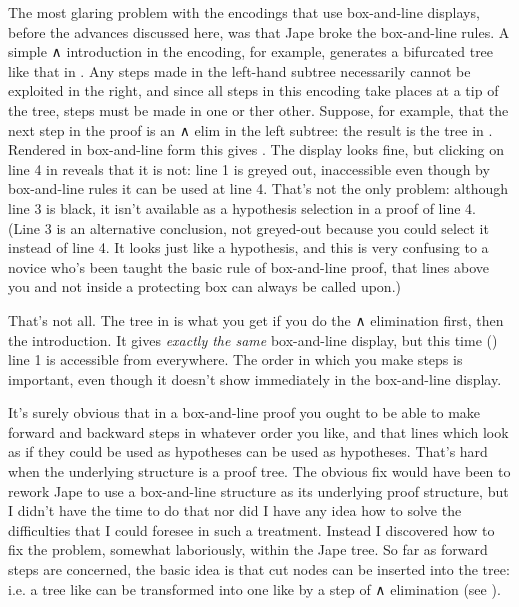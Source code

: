 The most glaring problem with the encodings that use box-and-line displays, before the advances discussed here, was that Jape broke the box-and-line rules. A simple ∧ introduction in the  encoding, for example, generates a bifurcated tree like that in . Any steps made in the left-hand subtree necessarily cannot be exploited in the right, and since all steps in this encoding take places at a tip of the tree, steps must be made in one or ther other. Suppose, for example, that the next step in the proof is an ∧ elim in the left subtree: the result is the tree in . Rendered in box-and-line form this gives . The display looks fine, but clicking on line 4 in  reveals that it is not: line 1 is greyed out, inaccessible even though by box-and-line rules it can be used at line 4. That's not the only problem: although line 3 is black, it isn't available as a hypothesis selection in a proof of line 4. (Line 3 is an alternative conclusion, not greyed-out because you could select it instead of line 4. It looks just like a hypothesis, and this is very confusing to a novice who's been taught the basic rule of box-and-line proof, that lines above you and not inside a protecting box can always be called upon.)

That's not all. The tree in  is what you get if you do the ∧ elimination first, then the introduction. It gives \emph{exactly the same} box-and-line display, but this time () line 1 is accessible from everywhere. The order in which you make steps is important, even though it doesn't show immediately in the box-and-line display. 

It's surely obvious that in a box-and-line proof you ought to be able to make forward and backward steps in whatever order you like, and that lines which look as if they could be used as hypotheses can be used as hypotheses. That's hard when the underlying structure is a proof tree. The obvious fix would have been to rework Jape to use a box-and-line structure as its underlying proof structure, but I didn't have the time to do that nor did I have any idea how to solve the difficulties that I could foresee in such a treatment. Instead I discovered how to fix the problem, somewhat laboriously, within the Jape tree. So far as forward steps are concerned, the basic idea is that cut nodes can be inserted into the tree: i.e. a tree like  can be transformed into one like  by a step of ∧ elimination (see ).

